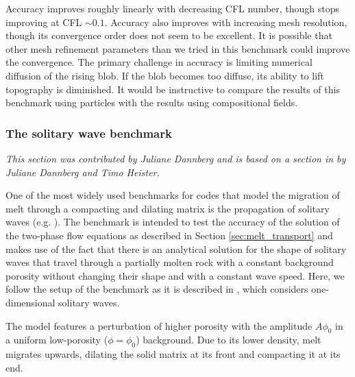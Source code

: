 \documentclass{article}
\begin{document}
Accuracy improves roughly linearly with decreasing CFL number, though stops improving at CFL $\sim 0.1$.
Accuracy also improves with increasing mesh resolution, though its convergence order does not seem 
to be excellent.  It is possible that other mesh refinement parameters than we tried in this benchmark 
could improve the convergence. The primary challenge in accuracy is limiting numerical diffusion 
of the rising blob. If the blob becomes too diffuse, its ability to lift topography is diminished.
It would be instructive to compare the results of this benchmark using particles with the 
results using compositional fields.

\subsubsection{The solitary wave benchmark}
\label{sec:benchmark-solitary_wave}

\textit{This section was contributed by Juliane Dannberg and is based on a section in \cite{dannberg_melt} by Juliane Dannberg and Timo Heister.}

One of the most widely used benchmarks for codes that model the migration of melt through a compacting and dilating matrix is the propagation of solitary waves (e.g. \cite{SS11, KMK2013, Schm00}). 
The benchmark is intended to test the accuracy of the solution of the two-phase flow equations as described in Section \ref{sec:melt_transport} and makes use of the fact that there is an analytical solution for the shape of solitary waves that travel through a partially molten rock with a constant background porosity without changing their shape and with a constant wave speed. 
Here, we follow the setup of the benchmark as it is described in \cite{BR86}, which considers one-dimensional solitary waves.

The model features a perturbation of higher porosity with the amplitude $A \phi_0$ in a uniform low-porosity ($\phi=\phi_0$) background.  Due to its lower density, melt migrates upwards, dilating the solid matrix at its front and compacting it at its end. 
\end{document}
